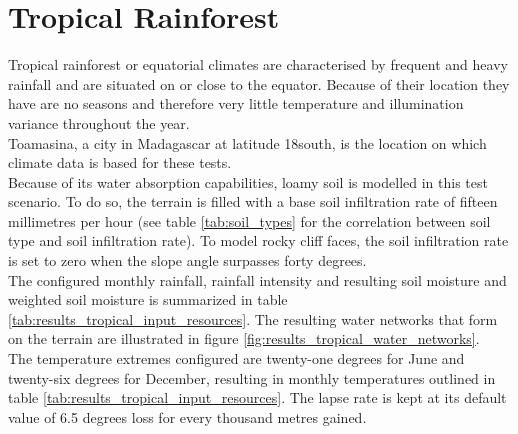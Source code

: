 \section{Tropical Rainforest} \label{sec:results_trop_rainforest}

Tropical rainforest or equatorial climates are characterised by frequent and heavy rainfall and are situated on or close to the equator. Because of their location they have are no seasons and therefore very little temperature and illumination variance throughout the year.\\

Toamasina, a city in Madagascar at latitude 18\textdegree south, is the location on which climate data is based for these tests.\\

Because of its water absorption capabilities, loamy soil is modelled in this test scenario. To do so, the terrain is filled with a base soil infiltration rate of fifteen millimetres per hour (see table \ref{tab:soil_types} for the correlation between soil type and soil infiltration rate). To model rocky cliff faces, the soil infiltration rate is set to zero when the slope angle surpasses forty degrees.\\

The configured monthly rainfall, rainfall intensity and resulting soil moisture and weighted soil moisture is summarized in table \ref{tab:results_tropical_input_resources}. The resulting water networks that form on the terrain are illustrated in figure \ref{fig:results_tropical_water_networks}.\\

The temperature extremes configured are twenty-one degrees for June and twenty-six degrees for December, resulting in monthly temperatures outlined in table \ref{tab:results_tropical_input_resources}. The lapse rate is kept at its default value of 6.5 degrees loss for every thousand metres gained. \\

